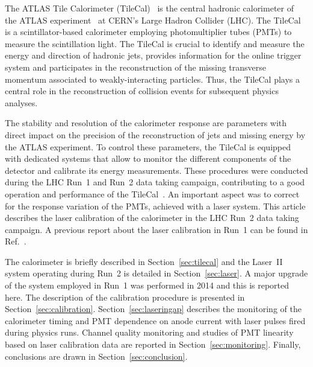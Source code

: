 The ATLAS Tile Calorimeter (TileCal)~\cite{TCAL-2010-01} is the central hadronic calorimeter of the ATLAS experiment~\cite{PERF-2007-01} at CERN's Large Hadron Collider (LHC). The TileCal is a scintillator-based calorimeter employing photomultiplier tubes (PMTs) to measure the scintillation light. The TileCal is crucial to identify and measure the energy and direction of hadronic jets, provides information for the online trigger system and participates in the reconstruction of the missing transverse momentum associated to weakly-interacting particles. Thus, the TileCal plays a central role in the reconstruction of collision events for subsequent physics analyses.

The stability and resolution of the calorimeter response are parameters with direct impact on the precision of the reconstruction of jets and missing energy by the ATLAS experiment. To control these parameters, the TileCal is equipped with dedicated systems that allow to monitor the different components of the detector and calibrate its energy measurements. These procedures were conducted during the LHC Run~1 and Run~2 data taking campaign, contributing to a good operation and performance of the TileCal~\cite{TCAL-2017-01}. An important aspect was to correct for the response variation of the PMTs, achieved with a laser system. This article describes the laser calibration of the calorimeter in the LHC Run~2 data taking campaign. A previous report about the laser calibration in Run~1 can be found in Ref.~\cite{bib:laser_run_1}.

The calorimeter is briefly described in Section~\ref{sec:tilecal} and the Laser~II system operating during Run~2 is detailed in Section~\ref{sec:laser}. A major upgrade of the system employed in Run~1 was performed in 2014 and this is reported here. The description of the calibration procedure is presented in Section~\ref{sec:calibration}. Section~\ref{sec:laseringap} describes the monitoring of the calorimeter timing and PMT dependence on anode current with laser pulses fired during physics runs. Channel quality monitoring and studies of PMT linearity based on laser calibration data are reported in Section~\ref{sec:monitoring}. Finally, conclusions are drawn in Section~\ref{sec:conclusion}.



